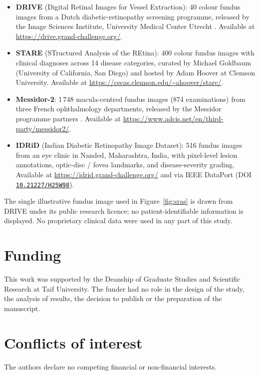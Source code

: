 \documentclass[twocolumn,10pt]{article}
\begin{document}
\begin{itemize}[leftmargin=*,nosep]
\item \textbf{DRIVE} (Digital Retinal Images for Vessel
  Extraction): 40 colour fundus images from a Dutch
  diabetic-retinopathy screening programme, released by the
  Image Sciences Institute, University Medical Center Utrecht
  \cite{Staal2004DRIVE}.
  Available at \url{https://drive.grand-challenge.org/}.

\item \textbf{STARE} (STructured Analysis of the REtina):
  400 colour fundus images with clinical diagnoses across
  14 disease categories, curated by Michael Goldbaum (University
  of California, San Diego) and hosted by Adam Hoover at Clemson
  University. Available at
  \url{https://cecas.clemson.edu/~ahoover/stare/}.

\item \textbf{Messidor-2}: 1\,748 macula-centred fundus images
  (874 examinations) from three French ophthalmology departments,
  released by the Messidor programme partners
  \cite{Decenciere2014Messidor}. Available at
  \url{https://www.adcis.net/en/third-party/messidor2/}.

\item \textbf{IDRiD} (Indian Diabetic Retinopathy Image
  Dataset): 516 fundus images from an eye clinic in Nanded,
  Maharashtra, India, with pixel-level lesion annotations,
  optic-disc / fovea landmarks, and disease-severity grading.
  Available at
  \url{https://idrid.grand-challenge.org/} and via IEEE
  DataPort (DOI
  \href{https://doi.org/10.21227/H25W98}{\texttt{10.21227/H25W98}}).
\end{itemize}

\noindent
The single illustrative fundus image used in
Figure~\ref{fig:sras} is drawn from DRIVE under its public
research licence; no patient-identifiable information is
displayed. No proprietary clinical data were used in any part of
this study.

\section*{Funding}
This work was supported by the Deanship of Graduate Studies and
Scientific Research at Taif University. The funder had no role in
the design of the study, the analysis of results, the decision
to publish or the preparation of the manuscript.

\section*{Conflicts of interest}
The authors declare no competing financial or non-financial
interests.
\end{document}
